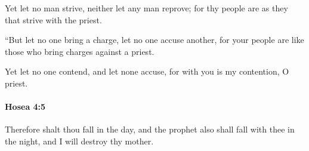 			\begin{versebox}
					\item[BHS] 
					\item[LXX] 
					\item[ASV] Yet let no man strive, neither let any man reprove; for thy people are as they that strive with the priest.
					\item[NIV] “But let no one bring a charge, let no one accuse another, for your people are like those who bring charges against a priest.
					\item[NRSV] Yet let no one contend, and let none accuse, for with you is my contention, O priest.
			\end{versebox}

		\paragraph{Hosea 4:5} %
			\label{HOSEA-4-5}

			Therefore shalt thou fall in the day, and the prophet also shall fall with thee in the night, and I will destroy thy mother.

